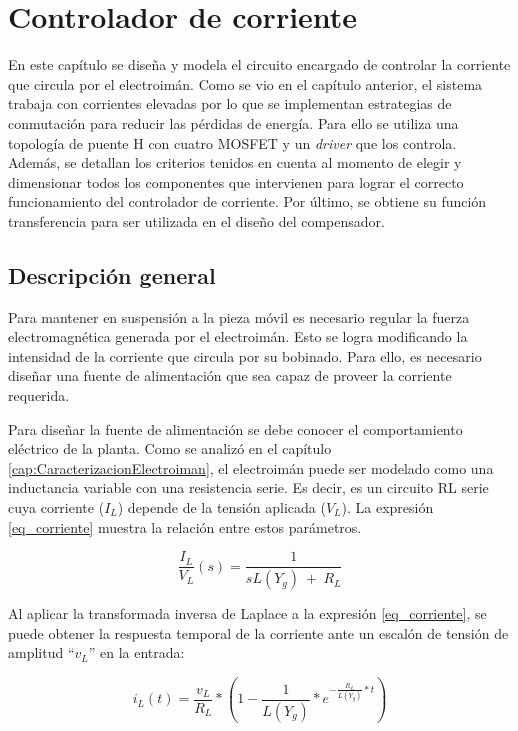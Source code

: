 \chapter{Controlador de corriente}  \label{cap:ControladorCorriente}

En este capítulo se diseña y modela el circuito encargado de controlar la corriente que circula por el electroimán. Como se vio en el capítulo anterior, el sistema trabaja con corrientes elevadas por lo que se implementan estrategias de conmutación para reducir las pérdidas de energía. Para ello se utiliza una topología de puente H con cuatro MOSFET y un \textsl{driver} que los controla. Además, se detallan los criterios tenidos en cuenta al momento de  elegir  y dimensionar todos los componentes que intervienen para lograr el correcto funcionamiento del controlador de corriente. Por último, se obtiene su función transferencia  para ser utilizada en el diseño del compensador.

\section{Descripción general}

Para mantener en suspensión a la pieza móvil es necesario regular la fuerza electromagnética generada por el electroimán. Esto se logra modificando la intensidad de la corriente que circula por su bobinado. Para ello, es necesario diseñar una fuente de alimentación que sea capaz de proveer la corriente requerida.

Para diseñar la fuente de alimentación se debe conocer el comportamiento eléctrico de la planta. Como se analizó en el capítulo \ref{cap:CaracterizacionElectroiman}, el electroimán puede ser modelado como una inductancia variable con una resistencia serie. Es decir, es un circuito RL serie cuya corriente ($I_L$) depende de la tensión aplicada ($V_L$). La expresión \ref{eq_corriente} muestra la relación entre estos parámetros.

\begin{equation} \label{eq_corriente}
\frac{I_L}{V_L}(s)=\frac{1}{sL(Y_g)\ +\ R_L}
\end{equation}

Al aplicar la transformada inversa de Laplace a la expresión  \ref{eq_corriente}, se puede obtener la respuesta temporal de la corriente ante un escalón de tensión de amplitud ``$v_L$'' en la entrada:

\begin{equation} \label{eq_corriente_temporal}
	i_L(t)=\frac{v_L}{R_L}*(1-\frac{1}{L(Y_g)}*e^{-\frac{R_L}{L(Y_g)}*t})
\end{equation}

